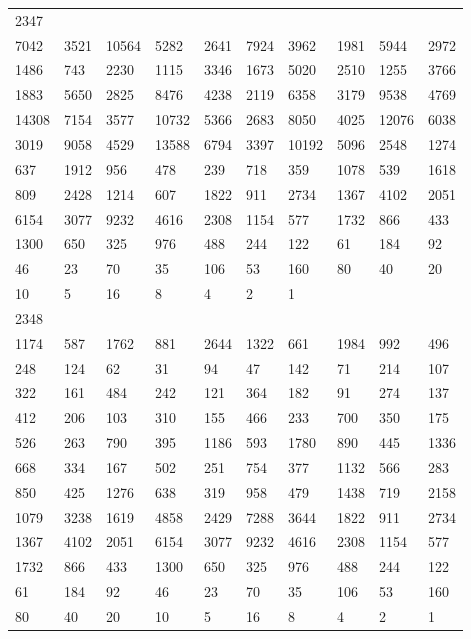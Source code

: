 \begin{longtable}{*{10}{l}}
2347&&&&&&&&&\\
7042& 3521& 10564& 5282& 2641& 7924& 3962& 1981& 5944& 2972\\
1486& 743& 2230& 1115& 3346& 1673& 5020& 2510& 1255& 3766\\
1883& 5650& 2825& 8476& 4238& 2119& 6358& 3179& 9538& 4769\\
14308& 7154& 3577& 10732& 5366& 2683& 8050& 4025& 12076& 6038\\
3019& 9058& 4529& 13588& 6794& 3397& 10192& 5096& 2548& 1274\\
637& 1912& 956& 478& 239& 718& 359& 1078& 539& 1618\\
809& 2428& 1214& 607& 1822& 911& 2734& 1367& 4102& 2051\\
6154& 3077& 9232& 4616& 2308& 1154& 577& 1732& 866& 433\\
1300& 650& 325& 976& 488& 244& 122& 61& 184& 92\\
46& 23& 70& 35& 106& 53& 160& 80& 40& 20\\
10& 5& 16& 8& 4& 2& 1& \\

2348&&&&&&&&&\\
1174& 587& 1762& 881& 2644& 1322& 661& 1984& 992& 496\\
248& 124& 62& 31& 94& 47& 142& 71& 214& 107\\
322& 161& 484& 242& 121& 364& 182& 91& 274& 137\\
412& 206& 103& 310& 155& 466& 233& 700& 350& 175\\
526& 263& 790& 395& 1186& 593& 1780& 890& 445& 1336\\
668& 334& 167& 502& 251& 754& 377& 1132& 566& 283\\
850& 425& 1276& 638& 319& 958& 479& 1438& 719& 2158\\
1079& 3238& 1619& 4858& 2429& 7288& 3644& 1822& 911& 2734\\
1367& 4102& 2051& 6154& 3077& 9232& 4616& 2308& 1154& 577\\
1732& 866& 433& 1300& 650& 325& 976& 488& 244& 122\\
61& 184& 92& 46& 23& 70& 35& 106& 53& 160\\
80& 40& 20& 10& 5& 16& 8& 4& 2& 1\\


\end{longtable}
